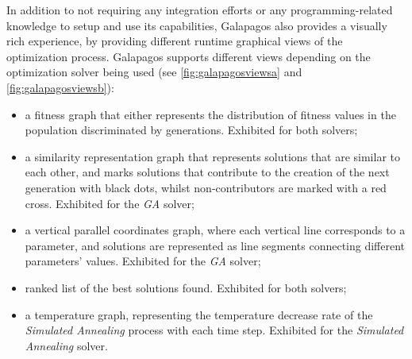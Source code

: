 	In addition to not requiring any integration efforts or any programming-related knowledge to setup and use its capabilities, Galapagos also provides a visually rich experience, by providing different runtime graphical views of the optimization process. Galapagos supports different views depending on the optimization solver being used (see \cref{fig:galapagosviewsa} and \cref{fig:galapagosviewsb}):
	\begin{itemize}
		\item a fitness graph that either represents the distribution of fitness values in the population discriminated by generations. Exhibited for both solvers;
		\item a similarity representation graph that represents solutions that are similar to each other, and marks solutions that contribute to the creation of the next generation with black dots, whilst non-contributors are marked with a red cross. Exhibited for the \textit{\ac{GA}} solver;
		\item a vertical parallel coordinates graph, where each vertical line corresponds to a parameter, and solutions are represented as line segments connecting different parameters' values. Exhibited for the \textit{\ac{GA}} solver;
		\item ranked list of the best solutions found. Exhibited for both solvers;
		\item a temperature graph, representing the temperature decrease rate of the \textit{Simulated Annealing} process with each time step. Exhibited for the \textit{Simulated Annealing} solver.
	\end{itemize}
	
